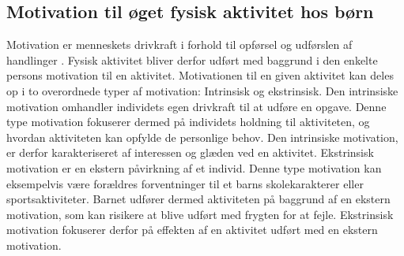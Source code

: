 \subsection{Motivation til øget fysisk aktivitet hos børn} \label{motivation_boern}
Motivation er menneskets drivkraft i forhold til opførsel og udførslen af handlinger \citep{V.Brown2007}. Fysisk aktivitet bliver derfor udført med baggrund i den enkelte persons motivation til en aktivitet. Motivationen til en given aktivitet kan deles op i to overordnede typer af motivation: Intrinsisk og ekstrinsisk. \newline
Den intrinsiske motivation omhandler individets egen drivkraft til at udføre en opgave. Denne type motivation fokuserer dermed på individets holdning til aktiviteten, og hvordan aktiviteten kan opfylde de personlige behov. Den intrinsiske motivation, er derfor karakteriseret af interessen og glæden ved en aktivitet.  \newline
Ekstrinsisk motivation er en ekstern påvirkning af et individ. Denne type motivation kan eksempelvis være forældres forventninger til et barns skolekarakterer eller sportsaktiviteter. Barnet udfører dermed aktiviteten på baggrund af en ekstern motivation, som kan risikere at blive udført med frygten for at fejle. Ekstrinsisk motivation fokuserer derfor på effekten af en aktivitet udført med en ekstern motivation. \citep{J.SebireJagoR.FoxEtAl2013} 

